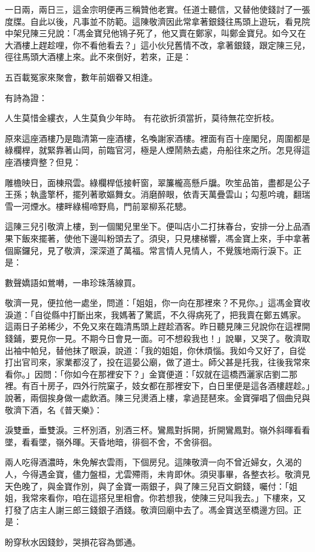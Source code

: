 一日兩，兩日三，這金宗明便再三稱贊他老實。任道士聽信，又替他使錢討了一張度牒。自此以後，凡事並不防範。這陳敬濟因此常拿著銀錢往馬頭上遊玩，看見院中架兒陳三兒說：「馮金寶兒他鴇子死了，他又賣在鄭家，叫鄭金寶兒。如今又在大酒樓上趕趁哩，你不看他看去？」這小伙兒舊情不改，拿著銀錢，跟定陳三兒，徑往馬頭大酒樓上來。此不來倒好，若來，正是：

五百載冤家來聚會，數年前姻眷又相逢。

有詩為證：

人生莫惜金縷衣，人生莫負少年時。
有花欲折須當折，莫待無花空折枝。

原來這座酒樓乃是臨清第一座酒樓，名喚謝家酒樓。裡面有百十座閣兒，周圍都是綠欄桿，就緊靠著山岡，前臨官河，極是人煙鬧熱去處，舟船往來之所。怎見得這座酒樓齊整？但見：

雕檐映日，面棟飛雲。綠欄桿低接軒窗，翠簾櫳高懸戶牖。吹笙品笛，盡都是公子王孫；執盞擎杯，擺列著歌嫗舞女。消磨醉眼，依青天萬疊雲山；勾惹吟魂，翻瑞雪一河煙水。樓畔綠楊啼野鳥，門前翠柳系花驄。

這陳三兒引敬濟上樓，到一個閣兒里坐下。便叫店小二打抹春台，安排一分上品酒果下飯來擺著，使他下邊叫粉頭去了。須臾，只見樓梯響，馮金寶上來，手中拿著個廝鑼兒，見了敬濟，深深道了萬福。常言情人見情人，不覺簇地兩行淚下。正是：

數聲嬌語如鶯囀，一串珍珠落線買。

敬濟一見，便拉他一處坐，問道：「姐姐，你一向在那裡來？不見你。」這馮金寶收淚道：「自從縣中打斷出來，我媽著了驚謊，不久得病死了，把我賣在鄭五媽家。這兩日子弟稀少，不免又來在臨清馬頭上趕趁酒客。昨日聽見陳三兒說你在這裡開錢鋪，要見你一見。不期今日會見一面。可不想殺我也！」說畢，又哭了。敬濟取出袖中帕兒，替他抹了眼淚，說道：「我的姐姐，你休煩惱。我如今又好了，自從打出官司來，家業都沒了，投在這晏公廟，做了道士。師父甚是托我，往後我常來看你。」因問：「你如今在那裡安下？」金寶便道：「奴就在這橋西灑家店劉二那裡。有百十房子，四外行院窠子，妓女都在那裡安下，白日里便是這各酒樓趕趁。」說著，兩個挨身做一處飲酒。陳三兒燙酒上樓，拿過琵琶來。金寶彈唱了個曲兒與敬濟下酒，名《普天樂》：

淚雙垂，垂雙淚。三杯別酒，別酒三杯。鸞鳳對拆開，折開鸞鳳對。嶺外斜暉看看墜，看看墜，嶺外暉。天昏地暗，徘徊不舍，不舍徘徊。

兩人吃得酒濃時，朱免解衣雲雨，下個房兒。這陳敬濟一向不曾近婦女，久渴的人，今得遇金寶，儘力盤桓，尤雲殢雨，未肯即休。須臾事畢，各整衣衫。敬濟見天色晚了，與金寶作別，與了金寶一兩銀子，與了陳三兒百文銅錢，囑付：「姐姐，我常來看你，咱在這搭兒里相會。你若想我，使陳三兒叫我去。」下樓來，又打發了店主人謝三郎三錢銀子酒錢。敬濟回廟中去了。馮金寶送至橋邊方回。正是：

盼穿秋水因錢鈔，哭損花容為鄧通。



